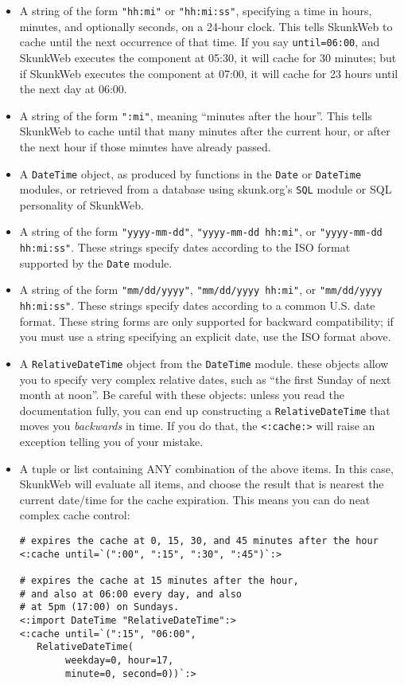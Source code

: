 \documentclass{manual}
\begin{document}
\begin{itemize}
\item A string of the form \texttt{"hh:mi"} or
\texttt{"hh:mi:ss"}, specifying a time in hours, minutes,
and optionally seconds, on a 24-hour clock. This tells SkunkWeb
to cache until the next occurrence of that time. If you say
\texttt{until=06:00}, and SkunkWeb executes the component at 
05:30, it will cache for 30 minutes; but if SkunkWeb executes the 
component at 07:00, it will cache for 23 hours until the next
day at 06:00.

\item A string of the form \texttt{":mi"}, meaning 
``minutes after the hour''. This tells SkunkWeb to cache until
that many minutes after the current hour, or after the
next hour if those minutes have already passed.

\item A \texttt{DateTime} object, as produced by functions in the
\texttt{Date} or \texttt{DateTime} modules, or retrieved
from a database using skunk.org's \texttt{SQL} module
or SQL personality of SkunkWeb.

\item A string of the form \texttt{"yyyy-mm-dd"},
\texttt{"yyyy-mm-dd hh:mi"}, or \texttt{"yyyy-mm-dd hh:mi:ss"}.
These strings specify dates according to the ISO 
format supported by the \texttt{Date} module.

\item A string of the form \texttt{"mm/dd/yyyy"},
\texttt{"mm/dd/yyyy hh:mi"}, or \texttt{"mm/dd/yyyy hh:mi:ss"}.
These strings specify dates according to a common
U.S. date format. These string forms are only supported
for backward compatibility; if you must use a string
specifying an explicit date, use the ISO format above.

\item A \texttt{RelativeDateTime} object from the \texttt{DateTime}
module. these objects allow you to specify very complex
relative dates, such as ``the first Sunday of next month
at noon''. Be careful with these objects: unless you
read the documentation fully, you can end up constructing
a \texttt{RelativeDateTime} that moves you \emph{backwards} in time.
If you do that, the \texttt{<:cache:>} will raise
an exception telling you of your mistake.

\item A tuple or list containing ANY combination of the above
items. In this case, SkunkWeb will evaluate all items, and choose
the result that is nearest the current date/time for 
the cache expiration. This means you can do neat complex
cache control:

\begin{verbatim}# expires the cache at 0, 15, 30, and 45 minutes after the hour
<:cache until=`(":00", ":15", ":30", ":45")`:>

# expires the cache at 15 minutes after the hour,
# and also at 06:00 every day, and also
# at 5pm (17:00) on Sundays.
<:import DateTime "RelativeDateTime":>
<:cache until=`(":15", "06:00", 
   RelativeDateTime(
        weekday=0, hour=17, 
        minute=0, second=0))`:>

\end{verbatim}
\end{itemize}
\end{document}
